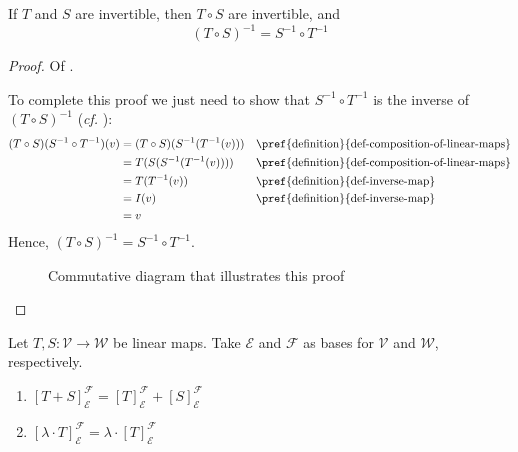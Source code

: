 \begin{thm}\label{thm-invertible-composition}
	If $T$ and $S$ are invertible, then $T \circ S$ are invertible, and
	\begin{equation}
		(T \circ S)^{-1} = S^{-1} \circ T^{-1}
	\end{equation}
\end{thm}

\begin{proof}
	Of .
	\begin{flushleft}
		To complete this proof we just need to show that $S^{-1} \circ T^{-1}$
		is the inverse of $(T \circ S)^{-1}$ (\textit{cf.} ):
		\begin{align*}
			(T \circ S)(S^{-1} \circ T^{-1})(v)
			 & = (T \circ S)(S^{-1}(T^{-1}(v))) &  & \text{\pref{definition}{def-composition-of-linear-maps}} \\
			 & = T(S(S^{-1}(T^{-1}(v))))        &  & \text{\pref{definition}{def-composition-of-linear-maps}} \\
			 & = T(T^{-1}(v))                   &  & \text{\pref{definition}{def-inverse-map}}                \\
			 & = I(v)                           &  & \text{\pref{definition}{def-inverse-map}}                \\
			 & = v
		\end{align*}
		Hence, $(T \circ S)^{-1} = S^{-1} \circ T^{-1}$.
		\begin{figure}[ht!]
			\centering
			\caption{Commutative diagram that illustrates this proof}
			\label{commutative-diagram:linear-composition:4}
		\end{figure}
	\end{flushleft}
\end{proof}

\begin{thm}\label{thm-linear-operators-matrix-rep}
	Let $T,S:\mathcal{V}\to\mathcal{W}$ be linear maps. Take $\mathcal{E}$
	and $\mathcal{F}$ as bases for $\mathcal{V}$ and $\mathcal{W}$, respectively.
	\begin{enumerate}
		\item $[T+S]_\mathcal{E}^\mathcal{F}=[T]_\mathcal{E}^\mathcal{F}+[S]_\mathcal{E}^\mathcal{F}$
		\item $[\lambda \cdot T]_\mathcal{E}^\mathcal{F}=\lambda \cdot [T]_\mathcal{E}^\mathcal{F}$
	\end{enumerate}
\end{thm}

